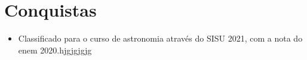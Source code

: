 \section{Conquistas}
\begin{itemize} %
    \item Classificado para o curso de astronomia através do SISU 2021, com a nota do enem 2020.hjgjgjgjg
\end{itemize} %

